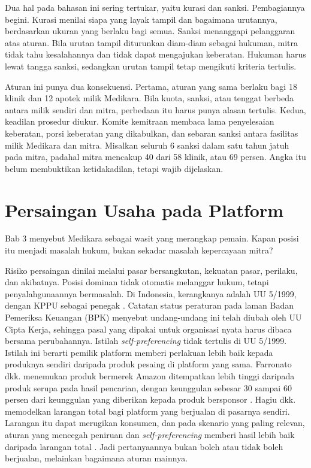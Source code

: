 Dua hal pada bahasan ini sering tertukar, yaitu kurasi dan sanksi. Pembagiannya begini. Kurasi menilai siapa yang layak tampil dan bagaimana urutannya, berdasarkan ukuran yang berlaku bagi
semua. Sanksi menanggapi pelanggaran atas aturan. Bila urutan tampil diturunkan diam-diam sebagai hukuman, mitra tidak tahu kesalahannya dan tidak dapat mengajukan keberatan. Hukuman harus
lewat tangga sanksi, sedangkan urutan tampil tetap mengikuti kriteria tertulis.

Aturan ini punya dua konsekuensi. Pertama, aturan yang sama berlaku bagi 18 klinik dan 12 apotek milik Medikara. Bila kuota, sanksi, atau tenggat berbeda antara milik sendiri dan mitra, perbedaan
itu harus punya alasan tertulis. Kedua, keadilan prosedur diukur. Komite kemitraan membaca lama penyelesaian keberatan, porsi keberatan yang dikabulkan, dan sebaran sanksi antara fasilitas milik
Medikara dan mitra. Misalkan seluruh 6 sanksi dalam satu tahun jatuh pada mitra, padahal mitra mencakup 40 dari 58 klinik, atau 69 persen. Angka itu belum membuktikan ketidakadilan, tetapi wajib
dijelaskan.

\section{Persaingan Usaha pada Platform}

Bab 3 menyebut Medikara sebagai wasit yang merangkap pemain. Kapan posisi itu menjadi masalah hukum, bukan sekadar masalah kepercayaan mitra?

Risiko persaingan dinilai melalui pasar bersangkutan, kekuatan pasar, perilaku, dan akibatnya. Posisi dominan tidak otomatis melanggar hukum, tetapi penyalahgunaannya bermasalah. Di Indonesia,
kerangkanya adalah UU 5/1999, dengan KPPU sebagai penegak \cite{uu5-1999-persaingan}. Catatan status peraturan pada laman Badan Pemeriksa Keuangan (BPK) menyebut undang-undang ini telah diubah oleh
UU Cipta Kerja, sehingga pasal yang dipakai untuk organisasi nyata harus dibaca bersama perubahannya. Istilah \textit{self-preferencing} tidak tertulis di UU 5/1999. Istilah ini berarti pemilik platform memberi
perlakuan lebih baik kepada produknya sendiri daripada produk pesaing di platform yang sama. Farronato dkk. menemukan produk bermerek Amazon ditempatkan lebih tinggi daripada produk serupa pada hasil
pencarian, dengan keunggulan sebesar 30 sampai 60 persen dari keunggulan yang diberikan kepada produk bersponsor \cite{c13-farronato2023}. Hagiu dkk. memodelkan larangan total bagi platform yang berjualan
di pasarnya sendiri. Larangan itu dapat merugikan konsumen, dan pada skenario yang paling relevan, aturan yang mencegah peniruan dan \textit{self-preferencing} memberi hasil lebih baik daripada larangan total
\cite{c13-hagiu2022}. Jadi pertanyaannya bukan boleh atau tidak boleh berjualan, melainkan bagaimana aturan mainnya.

